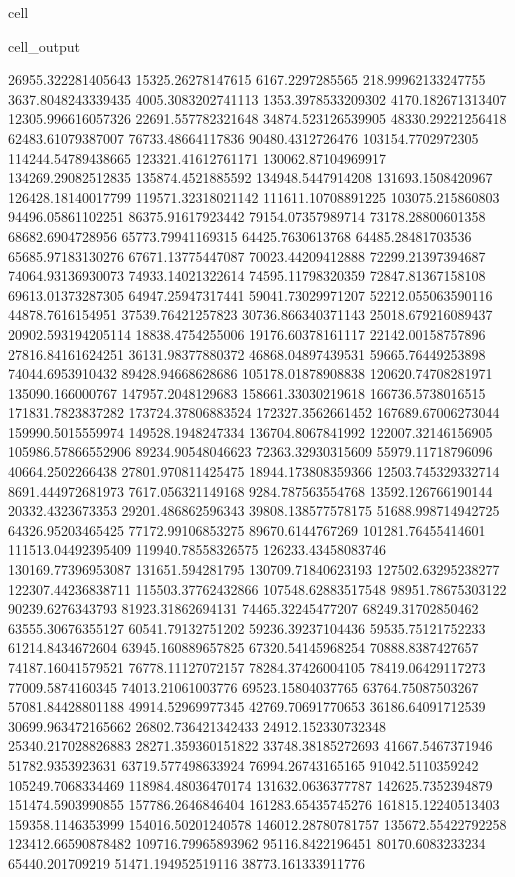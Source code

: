 \documentclass[letterpaper,10pt,english]{jupyterBook}
\begin{document}
\begin{sphinxuseclass}{cell}
\begin{sphinxVerbatimOutput}
\begin{sphinxuseclass}{cell_output}
\begin{sphinxVerbatim}[commandchars=\\\{\}]
26955.322281405643  15325.26278147615  6167.2297285565  \PYGZhy{}218.99962133247755  \PYGZhy{}3637.8048243339435  \PYGZhy{}4005.3083202741113  \PYGZhy{}1353.3978533209302  4170.182671313407  12305.996616057326  22691.557782321648  34874.523126539905  48330.29221256418  62483.61079387007  76733.48664117836  90480.4312726476  103154.7702972305  114244.54789438665  123321.41612761171  130062.87104969917  134269.29082512835  135874.4521885592  134948.5447914208  131693.1508420967  126428.18140017799  119571.32318021142  111611.10708891225  103075.215860803  94496.05861102251  86375.91617923442  79154.07357989714  73178.28800601358  68682.6904728956  65773.79941169315  64425.7630613768  64485.28481703536  65685.97183130276  67671.13775447087  70023.44209412888  72299.21397394687  74064.93136930073  74933.14021322614  74595.11798320359  72847.81367158108  69613.01373287305  64947.25947317441  59041.73029971207  52212.055063590116  44878.7616154951  37539.76421257823  30736.866340371143  25018.679216089437  20902.593194205114  18838.4754255006  19176.60378161117  22142.00158757896  27816.84161624251  36131.98377880372  46868.04897439531  59665.76449253898  74044.6953910432  89428.94668628686  105178.01878908838  120620.74708281971  135090.166000767  147957.2048129683  158661.33030219618  166736.5738016515  171831.7823837282  173724.37806883524  172327.3562661452  167689.67006273044  159990.5015559974  149528.1948247334  136704.8067841992  122007.32146156905  105986.57866552906  89234.90548046623  72363.32930315609  55979.11718796096  40664.2502266438  
27801.970811425475  18944.173808359366  12503.745329332714  8691.444972681973  7617.056321149168  9284.787563554768  13592.126766190144  20332.4323673353  29201.486862596343  39808.138577578175  51688.998714942725  64326.95203465425  77172.99106853275  89670.6144767269  101281.76455414601  111513.04492395409  119940.78558326575  126233.43458083746  130169.77396953087  131651.594281795  130709.71840623193  127502.63295238277  122307.44236838711  115503.37762432866  107548.62883517548  98951.78675303122  90239.6276343793  81923.31862694131  74465.32245477207  68249.31702850462  63555.30676355127  60541.79132751202  59236.39237104436  59535.75121752233  61214.8434672604  63945.160889657825  67320.54145968254  70888.8387427657  74187.16041579521  76778.11127072157  78284.37426004105  78419.06429117273  77009.5874160345  74013.21061003776  69523.15804037765  63764.75087503267  57081.84428801188  49914.52969977345  42769.70691770653  36186.64091712539  30699.963472165662  26802.736421342433  24912.152330732348  25340.217028826883  28271.359360151822  33748.38185272693  41667.5467371946  51782.9353923631  63719.577498633924  76994.26743165165  91042.5110359242  105249.7068334469  118984.48036470174  131632.0636377787  142625.7352394879  151474.5903990855  157786.2646846404  161283.65435745276  161815.12240513403  159358.1146353999  154016.50201240578  146012.28780781757  135672.55422792258  123412.66590878482  109716.79965893962  95116.8422196451  80170.6083233234  65440.201709219  51471.194952519116  38773.161333911776  

\end{sphinxVerbatim}
\end{sphinxuseclass}
\end{sphinxVerbatimOutput}
\end{sphinxuseclass}
\end{document}

